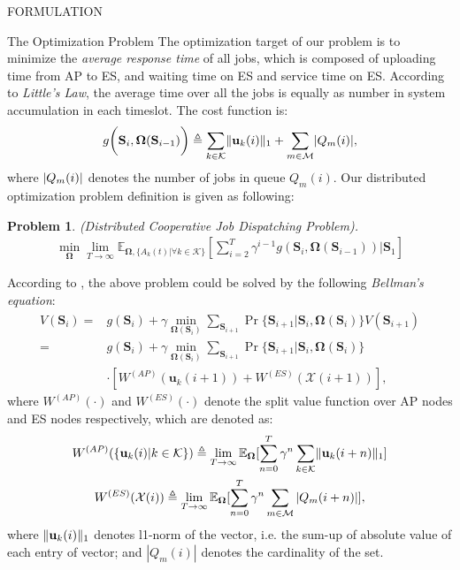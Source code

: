 \documentclass[10pt, conference, letterpaper]{IEEEtran}
\newtheorem{problem}{Problem}
\newcommand{\define}{\triangleq}
\renewcommand{\vec}{\mathbf}
\DeclarePairedDelimiter{\set}{\{}{\}}
\DeclarePairedDelimiter{\norm}{|}{|}
\DeclarePairedDelimiter{\Inorm}{\|}{\|_1}
\newcommand{\apSet}{\mathcal{K}}
\newcommand{\esSet}{\mathcal{M}}
\newcommand{\Stat}{\mathbf{S}}
\newcommand{\Obsv}{\mathcal{X}}
\newcommand{\Policy}{\mathbf{\Omega}}
\begin{document}
\begin{section}{FORMULATION}
        \begin{subsection}{The Optimization Problem}
            The optimization target of our problem is to minimize the \emph{average response time} of all jobs, which is composed of uploading time from AP to ES, and waiting time on ES and service time on ES. According to \emph{Little's Law}, the average time over all the jobs is equally as number in system accumulation in each timeslot. The cost function is:
            \begin{align}
                g \bigg( \Stat_{i}, \Policy(\Stat_{i-1}) \bigg) \define \sum_{k\in\apSet} \Inorm{\vec{u}_{k}(i)} + \sum_{m\in\esSet} \norm{Q_m(i)},
            \end{align}
            where $\norm{Q_m(i)}$ denotes the number of jobs in queue $Q_m(i)$.
            Our distributed optimization problem definition is given as following:
            \begin{problem}
                (Distributed Cooperative Job Dispatching Problem).
                \begin{gather}
                    \min_{\Policy} \lim_{T \to \infty}
                        \mathbb{E}_{\Policy, \{A_k(t)|\forall k\in\apSet\}}
                            [\sum_{i=2}^{T} \gamma^{i-1} g(\Stat_{i}, \Policy(\Stat_{i-1}))|\Stat_1]
                \end{gather}
            \end{problem}

            According to \cite{sutton1998introduction}, the above problem could be solved by the following \emph{Bellman's equation}:
            \begin{align}
                V(\Stat_{i}) =& g(\Stat_i) + \gamma \min_{\Policy(\Stat_{i})} \sum_{\Stat_{i+1}} \Pr\{ \Stat_{i+1}|\Stat_{i}, \Policy(\Stat_{i}) \} V(\Stat_{i+1})
                \nonumber\\
                =& g(\Stat_{i}) + \gamma \min_{\Policy(\Stat_{i})} \sum_{\Stat_{i+1}} \Pr\{ \Stat_{i+1}|\Stat_{i}, \Policy(\Stat_{i}) \}
                    \nonumber\\
                    & \cdot [W^{(AP)}(\vec{u}_k(i+1)) + W^{(ES)}(\Obsv(i+1))],
            \end{align}
            where $W^{(AP)}(\cdot)$ and $W^{(ES)}(\cdot)$ denote the split value function over AP nodes and ES nodes respectively, which are denoted as:
            \begin{gather}
                W^{(AP)}(\set{\vec{u}_k(i)|k\in\apSet}) \define \lim_{T\to\infty} \mathbb{E}_{\Policy}[\sum_{n=0}^{T} \gamma^{n} \sum_{k\in\apSet}\Inorm{\vec{u}_k(i+n)}]
                \\
                W^{(ES)}(\Obsv(i)) \define \lim_{T\to\infty} \mathbb{E}_{\Policy}[\sum_{n=0}^{T} \gamma^{n} \sum_{m\in\esSet}|Q_m(i+n)|],
            \end{gather}
            where $\Inorm{\vec{u}_k(i)}$ denotes l1-norm of the vector, i.e. the sum-up of absolute value of each entry of vector; and $|Q_m(i)|$ denotes the cardinality of the set.


\end{subsection}
\end{section}
\end{document}
